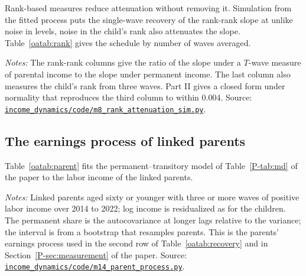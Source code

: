 \documentclass[11pt]{article}
\numberwithin{equation}{section}
\newcommand{\repourl}{https://github.com/JiachenJin1001/before-the-labor-market-or-inside-it}
\newcommand{\code}[1]{\href{\repourl/blob/main/#1}{\nolinkurl{#1}}}
\begin{document}
Rank-based measures \citep{Chetty2014} reduce attenuation without removing it. Simulation from the fitted process puts the single-wave recovery of the rank-rank slope at  unlike noise in levels, noise in the child's rank also attenuates the slope. Table~\ref{oatab:rank} gives the schedule by number of waves averaged.


\begin{table}[H]
\centering
\small
\caption{Attenuation of rank-rank slopes by number of waves averaged
(simulation from the fitted process).}
\label{oatab:rank}

\par\smallskip
\begin{minipage}{0.92\textwidth}
\footnotesize\emph{Notes:} The rank-rank columns give the ratio of the
slope under a $T$-wave measure of parental income to the slope under
permanent income. The last column also measures the child's rank from
three waves. Part II gives a closed form under normality that
reproduces the third column to within 0.004. Source:
\code{income_dynamics/code/m8_rank_attenuation_sim.py}.
\end{minipage}
\end{table}

\subsection{The earnings process of linked parents}

Table~\ref{oatab:parent} fits the permanent--transitory model of Table~\ref{P-tab:md} of the paper to the labor income of the linked parents.

\begin{table}[H]
\centering
\small
\caption{The earnings process of linked working parents.}
\label{oatab:parent}

\par\smallskip
\begin{minipage}{0.9\textwidth}
\footnotesize\emph{Notes:} Linked parents aged sixty or younger with
three or more waves of positive labor income over 2014 to 2022; log income is residualized as for the children. The permanent share is
the autocovariance at longer lags relative to the variance; the
interval is from a bootstrap that resamples parents. This is the parents' earnings process used in the second row of Table~\ref{oatab:recovery} and in Section~\ref{P-sec:measurement} of the paper. Source:
\code{income_dynamics/code/m14_parent_process.py}.
\end{minipage}
\end{table}
\end{document}
